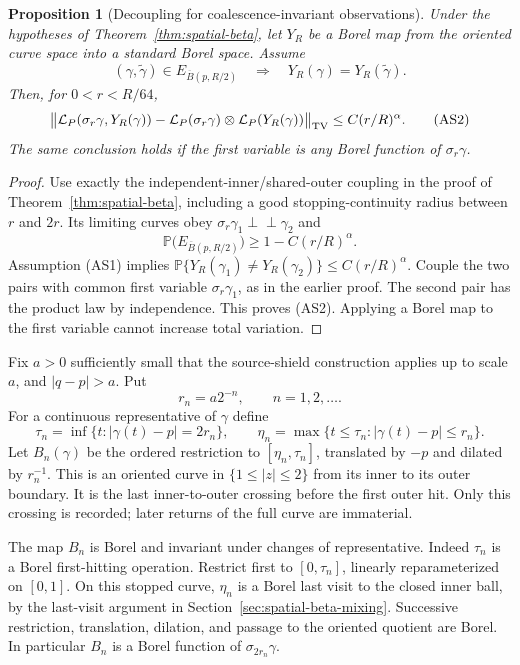 \documentclass[11pt]{article}
\newtheorem{proposition}[theorem]{Proposition}
\theoremstyle{definition}\newtheorem{definition}[theorem]{Definition}
\theoremstyle{remark}\newtheorem{remark}[theorem]{Remark}
\begin{document}
\begin{proposition}[Decoupling for coalescence-invariant observations]
\label{prop:scenery-decoupling}
Under the hypotheses of Theorem~\ref{thm:spatial-beta}, let $Y_R$ be
a Borel map from the oriented curve space into a standard Borel space.
Assume
\[
 (\gamma,\widetilde\gamma)\in E_{\overline B(p,R/2)}
       \quad\Longrightarrow\quad
 Y_R(\gamma)=Y_R(\widetilde\gamma).
 \tag{AS1}
\]
Then, for $0<r<R/64$,
\[
 \bigl\|\mathcal L_P(\sigma_r\gamma,Y_R(\gamma))
      -\mathcal L_P(\sigma_r\gamma)
                    \otimes\mathcal L_P(Y_R(\gamma))\bigr\|_{\rm TV}
 \le C(r/R)^\alpha.
 \tag{AS2}
\]
The same conclusion holds if the first variable is any Borel function
of $\sigma_r\gamma$.
\end{proposition}
\begin{proof}
Use exactly the independent-inner/shared-outer coupling in the proof of
Theorem~\ref{thm:spatial-beta}, including a good stopping-continuity
radius between $r$ and $2r$. Its limiting curves obey
$\sigma_r\gamma_1\perp\!\!\!\perp\gamma_2$ and
\[
 \mathbb P\bigl(E_{\overline B(p,R/2)}\bigr)
       \ge1-C(r/R)^\alpha.
\]
Assumption (AS1) implies
$\mathbb P\{Y_R(\gamma_1)\ne Y_R(\gamma_2)\}
\le C(r/R)^\alpha$. Couple the two pairs with common first variable
$\sigma_r\gamma_1$, as in the earlier proof. The second pair has the
product law by independence. This proves (AS2). Applying a Borel map
to the first variable cannot increase total variation.
\end{proof}

Fix $a>0$ sufficiently small that the source-shield construction applies
up to scale $a$, and $|q-p|>a$. Put
\[
 r_n=a2^{-n},\qquad n=1,2,\ldots.
\]
For a continuous representative of $\gamma$ define
\[
 \tau_n=\inf\{t:|\gamma(t)-p|=2r_n\},\qquad
 \eta_n=\max\{t\le\tau_n:|\gamma(t)-p|\le r_n\}.
 \tag{AS3}
\]
Let $B_n(\gamma)$ be the ordered restriction to $[\eta_n,\tau_n]$,
translated by $-p$ and dilated by $r_n^{-1}$. This is an oriented curve
in $\{1\le |z|\le2\}$ from its inner to its outer boundary. It is the
last inner-to-outer crossing before the first outer hit. Only this
crossing is recorded; later returns of the full curve are immaterial.

The map $B_n$ is Borel and invariant under changes of representative.
Indeed $\tau_n$ is a Borel first-hitting operation. Restrict first to
$[0,\tau_n]$, linearly reparameterized on $[0,1]$. On this stopped
curve, $\eta_n$ is a Borel last visit to the closed inner ball, by the
last-visit argument in Section~\ref{sec:spatial-beta-mixing}. Successive
restriction, translation, dilation, and passage to the oriented quotient
are Borel. In particular $B_n$ is a Borel function of
$\sigma_{2r_n}\gamma$.
\end{document}
